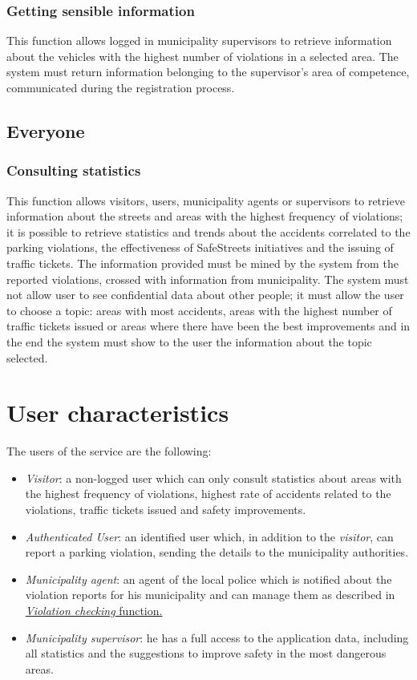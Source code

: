 \documentclass[a4paper]{report}
\begin{document}
\subsubsection{Getting sensible information}
This function allows logged in municipality supervisors to retrieve information about the vehicles with the highest number of violations in a selected area. The system must return information belonging to the supervisor's area of competence, communicated during the registration process.

\subsection{Everyone} 

\subsubsection{Consulting statistics}
This function allows visitors, users, municipality agents or supervisors to retrieve information about the streets and areas with the highest frequency of violations; it is possible to retrieve statistics and trends about the accidents correlated to the parking violations, the effectiveness of SafeStreets initiatives and the issuing of traffic tickets. The information provided must be mined by the system from the reported violations, crossed with information from municipality. The system must not allow user to see confidential data about other people; it must allow the user to choose a topic: areas with most accidents, areas with the highest number of traffic tickets issued or areas where there have been the best improvements and in the end the system must show to the user the information about the topic selected.



\section{User characteristics}
The users of the service are the following:
\begin{itemize}
\item \textit{Visitor}: a non-logged user which can only consult statistics about areas with the highest frequency of violations, highest rate of accidents related to the violations, traffic tickets issued and safety improvements. 
\item \textit{Authenticated User}: an identified user which, in addition to the \textit{visitor}, can report a parking violation, sending the details to the municipality authorities.
\item \textit{Municipality agent}: an agent of the local police which is notified about the violation reports for his municipality and can manage them as described in \hyperref[sub-agentfun]{\textit{Violation checking} function.}
\item \textit{Municipality supervisor}: he has a full access to the application data, including all statistics and the suggestions to improve safety in the most dangerous areas.
\end{itemize}
\end{document}
